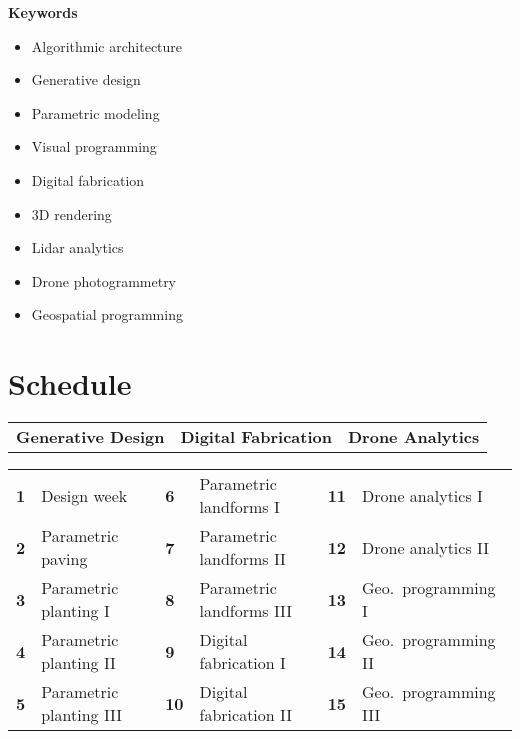 \documentclass[11pt,article,oneside]{memoir}
\begin{document}
\noindent\textbf{Keywords}
\begin{multicols}{3}
\raggedright
\small
\begin{itemize}
\item Algorithmic architecture
\item Generative design
\item Parametric modeling
\item Visual programming
\item Digital fabrication
\item 3D rendering
\item Lidar analytics
\item Drone photogrammetry
\item Geospatial programming
\end{itemize}
\end{multicols}

\section{Schedule}

\begin{table}[H]
\begin{tabular}{l @{\hskip 0.75cm} l @{\hskip 1.9cm} l}
\textbf{Generative Design} & \textbf{Digital Fabrication} & \textbf{Drone Analytics}\\
\end{tabular}
\end{table}
%
\vspace*{-1em}
%
\begin{table}[H]
\small
\begin{tabular}{l l l l l l}
\small
\textbf{1} & Design week & \textbf{6} & Parametric landforms I & \textbf{11} & Drone analytics I\\
\textbf{2} & Parametric paving & \textbf{7} & Parametric landforms II & \textbf{12} & Drone analytics II\\
\textbf{3} & Parametric planting I & \textbf{8} & Parametric landforms III & \textbf{13} & Geo.~programming I\\
\textbf{4} & Parametric planting II & \textbf{9} & Digital fabrication I & \textbf{14} & Geo.~programming II\\
\textbf{5} & Parametric planting III & \textbf{10} & Digital fabrication II & \textbf{15} & Geo.~programming III\\
\end{tabular}
\end{table}
\end{document}
